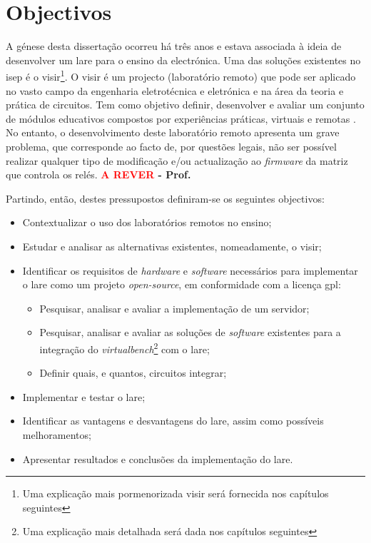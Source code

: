 \section{Objectivos}
\label{sec: Objectivos}
A génese desta dissertação ocorreu há três anos e estava associada à ideia de desenvolver um \acrfull{lare} para o ensino da electrónica. Uma das soluções existentes no \acrfull{isep} é o \acrfull{visir}\footnote{Uma explicação mais pormenorizada \acrshort{visir} será fornecida nos capítulos seguintes}.
O \acrshort{visir} é um projecto (\acrshort{laboratório remoto}) que pode ser aplicado no vasto campo da engenharia eletrotécnica e eletrónica e na área da teoria e prática de circuitos. Tem como objetivo definir, desenvolver e avaliar um conjunto de módulos educativos compostos por experiências práticas, virtuais e remotas \cite{visirisep}.
No entanto, o desenvolvimento deste \acrshort{laboratório remoto} apresenta um grave problema, que corresponde ao facto de, por questões legais, não ser possível realizar qualquer tipo de modificação e/ou actualização ao \textit{firmware} da matriz que controla os relés. \textbf{\textcolor{red}{A REVER} - Prof.}

Partindo, então, destes pressupostos definiram-se os seguintes objectivos:
\begin{itemize}
    \item Contextualizar o uso dos laboratórios remotos no ensino;
    \item Estudar e analisar as alternativas existentes, nomeadamente, o \acrshort{visir};
    \item Identificar os requisitos de \textit{hardware} e \textit{software} necessários para implementar o \acrshort{lare} como um projeto \textit{open-source}, em conformidade com a licença \acrfull{gpl}:
    \begin{itemize}
        \item Pesquisar, analisar e avaliar a implementação de um servidor;
        \item Pesquisar, analisar e avaliar as soluções de \textit{software} existentes para a integração do \textit{\acrfull{virtualbench}}\footnote{Uma explicação mais detalhada será dada nos capítulos seguintes} com o \acrshort{lare};
         \item Definir quais, e quantos, circuitos integrar;
    \end{itemize}
    \item Implementar e testar o \acrshort{lare};
    \item Identificar as vantagens e desvantagens do \acrshort{lare}, assim como possíveis melhoramentos;
    \item Apresentar resultados e conclusões da implementação do \acrshort{lare}.
\end{itemize}

